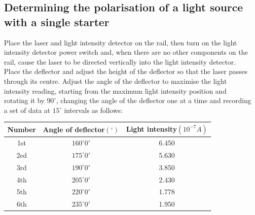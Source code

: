 \documentclass[UTF8]{article}
\begin{document}
	\subsection{Determining the polarisation of a light source with a single starter}
	Place the laser and light intensity detector on the rail, then turn on the light intensity detector power switch and, when there are no other components on the rail, cause the laser to be directed vertically into the light intensity detector. Place the deflector and adjust the height of the deflector so that the laser passes through its centre. Adjust the angle of the deflector to maximise the light intensity reading, starting from the maximum light intensity position and rotating it by $90^\circ$, changing the angle of the deflector one at a time and recording a set of data at $15^\circ$ intervals as follows:
	\begin{center}
			\begin{tabular}{ccc}
				\toprule
				Number & Angle of deflector$\left ( ^{\circ}  \right ) $ & Light intensity$\left ( 10^{-7}A  \right ) $\\
				\midrule
				1st & $160^{\circ} {0}' $ & 6.450 \\
				2ed & $175^{\circ} {0}' $ & 5.630 \\
				3rd & $190^{\circ} {0}' $ & 3.850 \\
				4th & $205^{\circ} {0}' $ & 2.430 \\
				5th & $220^{\circ} {0}' $ & 1.778 \\
				6th & $235^{\circ} {0}' $ & 1.950 \\
			    \bottomrule
				\end{tabular}
		\end{center}
	
\end{document}
